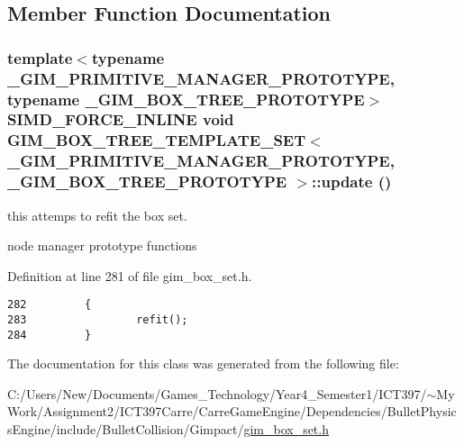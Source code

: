 \subsection{Member Function Documentation}
\hypertarget{class_g_i_m___b_o_x___t_r_e_e___t_e_m_p_l_a_t_e___s_e_t_0f5f2b683e561a4e05d912cb4973dac4}{
\subsubsection[update]{\setlength{\rightskip}{0pt plus 5cm}template$<$typename \_\-GIM\_\-PRIMITIVE\_\-MANAGER\_\-PROTOTYPE, typename \_\-GIM\_\-BOX\_\-TREE\_\-PROTOTYPE$>$ SIMD\_\-FORCE\_\-INLINE void {\bf GIM\_\-BOX\_\-TREE\_\-TEMPLATE\_\-SET}$<$ \_\-GIM\_\-PRIMITIVE\_\-MANAGER\_\-PROTOTYPE, \_\-GIM\_\-BOX\_\-TREE\_\-PROTOTYPE $>$::update ()}}
\label{class_g_i_m___b_o_x___t_r_e_e___t_e_m_p_l_a_t_e___s_e_t_0f5f2b683e561a4e05d912cb4973dac4}


this attemps to refit the box set. 

node manager prototype functions 

Definition at line 281 of file gim\_\-box\_\-set.h.

\begin{Code}\begin{verbatim}282         {
283                 refit();
284         }
\end{verbatim}
\end{Code}




The documentation for this class was generated from the following file:\begin{CompactItemize}
\item 
C:/Users/New/Documents/Games\_\-Technology/Year4\_\-Semester1/ICT397/$\sim$My Work/Assignment2/ICT397Carre/CarreGameEngine/Dependencies/BulletPhysicsEngine/include/BulletCollision/Gimpact/\hyperlink{gim__box__set_8h}{gim\_\-box\_\-set.h}\end{CompactItemize}
